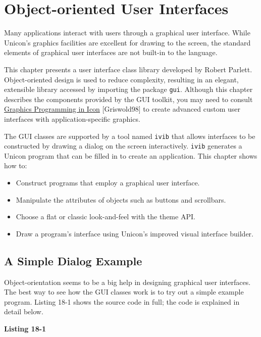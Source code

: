 \chapter{Object-oriented User Interfaces}

Many applications interact with users through a graphical
user interface. While
Unicon's graphics facilities are
excellent for drawing to the screen,
the standard elements of graphical
user interfaces are not built-in to the language.

This chapter presents a user interface class library developed by
Robert Parlett. Object-oriented design is used to reduce
complexity, resulting in an elegant, extensible library
accessed by importing the package \texttt{gui}.  Although this chapter
describes the components provided by the GUI toolkit, you may need to
consult \underline{Graphics Programming in Icon} [Griswold98] to create
advanced custom user interfaces with application-specific graphics.

The GUI classes are supported by a tool named \texttt{ivib} that
allows interfaces to be constructed by drawing a dialog on the screen
interactively. \texttt{ivib} generates a Unicon program that can be
filled in to create an application. This chapter shows how to:

\begin{itemize}
\item Construct programs that employ a graphical user interface.
\item Manipulate the attributes of objects such as buttons and scrollbars.
\item Choose a flat or classic look-and-feel with the theme API.
\item Draw a program's interface using Unicon's improved visual
      interface builder.
\end{itemize}

\section{A Simple Dialog Example}

Object-orientation seems to be a big help in designing
graphical user interfaces. The best way to see how the GUI classes
work is to try out a simple example program. Listing 18-1 shows the
source code in full; the code is explained in detail below.

{\sffamily\bfseries
Listing 18-1}

